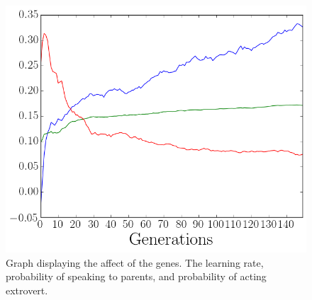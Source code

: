 \begin{figure}[htbp]
    \centering
    \includegraphics[scale=0.5]{fig/Results/Exp5/Genes1}
    \caption{Graph displaying the affect of the genes. The learning rate, probability of speaking to parents, and probability of acting extrovert.}
    \label{fig:Genes5}
\end{figure}

